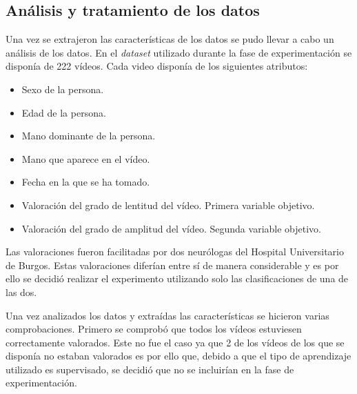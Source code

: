 \subsection{Análisis y tratamiento de los datos}
Una vez se extrajeron las características de los datos se pudo llevar a cabo un análisis de los datos.
En el \textit{dataset} utilizado durante la fase de experimentación se disponía de 222 vídeos. 
Cada video disponía de los siguientes atributos:
\begin{itemize}
\item Sexo de la persona.
\item Edad de la persona.
\item Mano dominante de la persona.
\item Mano que aparece en el vídeo.
\item Fecha en la que se ha tomado.
\item Valoración del grado de lentitud del vídeo. Primera variable objetivo.
\item Valoración del grado de amplitud del vídeo. Segunda variable objetivo.
\end{itemize}
Las valoraciones fueron facilitadas por dos neurólogas del  Hospital Universitario de Burgos. Estas valoraciones diferían entre sí de manera considerable y es por ello se decidió realizar el experimento utilizando solo las clasificaciones de una de las dos. 

Una vez analizados los datos y extraídas las características se hicieron varias comprobaciones. Primero se comprobó que todos los vídeos estuviesen correctamente valorados. Este no fue el caso ya que 2 de los vídeos de los que se disponía no estaban valorados es por ello que, debido a que el tipo de aprendizaje utilizado es supervisado, se decidió que no se incluirían en la fase de experimentación.

